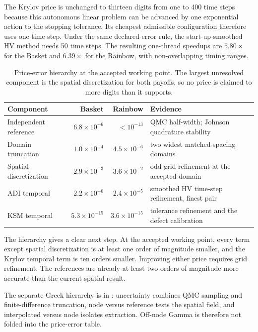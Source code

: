 The Krylov price is unchanged to thirteen digits from one to 400 time steps because this autonomous linear problem can be advanced by one exponential action to the stopping tolerance. Its cheapest admissible configuration therefore uses one time step. Under the same declared-error rule, the start-up-smoothed HV method needs 50 time steps. The resulting one-thread speedups are $5.80\times$ for the Basket and $6.39\times$ for the Rainbow, with non-overlapping timing ranges.

\begin{table}[htbp!]
\centering
\small
\setlength{\tabcolsep}{4pt}
\caption{Price-error hierarchy at the accepted working point. The largest unresolved component is the spatial discretization for both payoffs, so no price is claimed to more digits than it supports.}
\label{tab:fin-budget}
\begin{tabular}{@{}lrrp{5.2cm}@{}}
\toprule
\textbf{Component} & \textbf{Basket} & \textbf{Rainbow} & \textbf{Evidence} \\
\midrule
Independent reference   & $6.8\times10^{-6}$  & $<10^{-13}$ & QMC half-width; Johnson quadrature stability \\
Domain truncation       & $1.0\times10^{-4}$  & $4.5\times10^{-6}$  & two widest matched-spacing domains \\
Spatial discretization  & $2.9\times10^{-3}$  & $3.6\times10^{-2}$  & odd-grid refinement at the accepted domain \\
ADI temporal            & $2.2\times10^{-6}$  & $2.4\times10^{-5}$  & smoothed HV time-step refinement, finest pair \\
KSM temporal            & $5.3\times10^{-15}$ & $3.6\times10^{-15}$ & tolerance refinement and the defect calibration \\
\bottomrule
\end{tabular}
\end{table}

The hierarchy gives a clear next step. At the accepted working point, every term except spatial discretization is at least one order of magnitude smaller, and the Krylov temporal term is ten orders smaller. Improving either price requires grid refinement. The references are already at least two orders of magnitude more accurate than the current spatial result.

The separate Greek hierarchy is in : uncertainty combines QMC sampling and finite-difference truncation, node versus reference tests the spatial field, and interpolated versus node isolates extraction. Off-node Gamma is therefore not folded into the price-error table.

